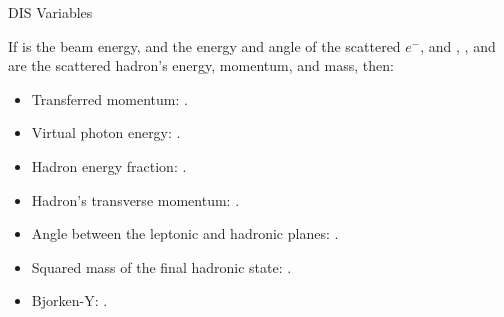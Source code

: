 \begin{frame}{DIS Variables}
    \label{20.06::dis_variables}

    \vspace{24pt}

    If  is the beam energy,  and  the energy and angle of the scattered $e^-$, and , , and  are the scattered hadron's energy, momentum, and mass, then:

    \vspace{12pt}

    \begin{itemize}
        \item
            Transferred momentum: .

        \item
            Virtual photon energy: .

        \item
            Hadron energy fraction: .

        \item
            Hadron's transverse momentum: .

        \item
            Angle between the leptonic and hadronic planes: .

        \item
            Squared mass of the final hadronic state: .

        \item
            Bjorken-Y: .
    \end{itemize}

\end{frame}
